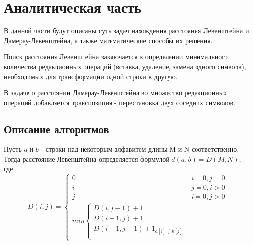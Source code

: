 \chapter{Аналитическая часть}
\label{cha:analysis}

В данной части будут описаны суть задач нахождения расстояния Левенштейна и Дамерау-Левенштейна, а также математические способы их решения.

Поиск расстояния Левенштейна заключается в определении минимального количества редакционных операций (вставка, удаление, замена одного символа), необходимых для трансформации одной строки в другую.

В задаче о расстоянии Дамерау-Левенштейна во множество редакционных операций добавляется транспозиция - перестановка двух соседних символов.

\section{Описание алгоритмов}

Пусть $a$ и $b$ - строки над некоторым алфавитом длины M и N соответственно. Тогда расстояние Левенштейна определяется формулой $d(a, b) = D(M, N)$, где
\begin{equation*}
    D(i, j) =
    \begin{cases}
        0 & i=0, j=0\\
        i & j=0, i>0\\
        j & i=0, j>0\\
        min
        \begin{cases}
            D(i, j-1) + 1\\
            D(i-1, j) + 1\\
            D(i-1, j-1) + 1_{a[i] \ne b[j]}\\
        \end{cases}
    \end{cases}
\end{equation*}

